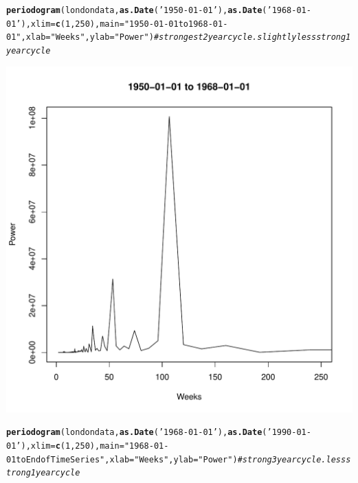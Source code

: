 \documentclass[12pt]{article}\usepackage[]{graphicx}\usepackage[]{color}
\makeatletter
\def\maxwidth{ %
  \ifdim\Gin@nat@width>\linewidth
    \linewidth
  \else
    \Gin@nat@width
  \fi
}
\newcommand{\hlnum}[1]{\textcolor[rgb]{0.686,0.059,0.569}{#1}}%
\newcommand{\hlstr}[1]{\textcolor[rgb]{0.192,0.494,0.8}{#1}}%
\newcommand{\hlcom}[1]{\textcolor[rgb]{0.678,0.584,0.686}{\textit{#1}}}%
\newcommand{\hlstd}[1]{\textcolor[rgb]{0.345,0.345,0.345}{#1}}%
\newcommand{\hlkwc}[1]{\textcolor[rgb]{0.333,0.667,0.333}{#1}}%
\newcommand{\hlkwd}[1]{\textcolor[rgb]{0.737,0.353,0.396}{\textbf{#1}}}%
\newenvironment{kframe}{%
 \def\at@end@of@kframe{}%
 \ifinner\ifhmode%
  \def\at@end@of@kframe{\end{minipage}}%
  \begin{minipage}{\columnwidth}%
 \fi\fi%
 \def\FrameCommand##1{\hskip\@totalleftmargin \hskip-\fboxsep
 \colorbox{shadecolor}{##1}\hskip-\fboxsep
     \hskip-\linewidth \hskip-\@totalleftmargin \hskip\columnwidth}%
 \MakeFramed {\advance\hsize-\width
   \@totalleftmargin\z@ \linewidth\hsize
   \@setminipage}}%
 {\par\unskip\endMakeFramed%
 \at@end@of@kframe}
\newenvironment{knitrout}{}{} %
\makeatother
\begin{document}
\begin{enumerate}[(a)]
\begin{knitrout}
\begin{kframe}\begin{alltt}
\hlkwd{periodogram}\hlstd{(londondata,}\hlkwd{as.Date}\hlstd{(}\hlstr{'1950-01-01'}\hlstd{),}\hlkwd{as.Date}\hlstd{(}\hlstr{'1968-01-01'}\hlstd{),}\hlkwc{xlim}\hlstd{=}\hlkwd{c}\hlstd{(}\hlnum{1}\hlstd{,}\hlnum{250}\hlstd{),} \hlkwc{main}\hlstd{=}\hlstr{"1950-01-01 to 1968-01-01"}\hlstd{,}\hlkwc{xlab}\hlstd{=}\hlstr{"Weeks"}\hlstd{,} \hlkwc{ylab}\hlstd{=}\hlstr{"Power"}\hlstd{)} \hlcom{#strongest 2 year cycle. slightly less strong 1 year cycle}
\end{alltt}
\end{kframe}
\includegraphics[width=\maxwidth]{figure/unnamed-chunk-5-5} 
\begin{kframe}\begin{alltt}
\hlkwd{periodogram}\hlstd{(londondata,}\hlkwd{as.Date}\hlstd{(}\hlstr{'1968-01-01'}\hlstd{),}\hlkwd{as.Date}\hlstd{(}\hlstr{'1990-01-01'}\hlstd{),}\hlkwc{xlim}\hlstd{=}\hlkwd{c}\hlstd{(}\hlnum{1}\hlstd{,}\hlnum{250}\hlstd{),} \hlkwc{main}\hlstd{=}\hlstr{"1968-01-01 to End of Time Series"}\hlstd{,}\hlkwc{xlab}\hlstd{=}\hlstr{"Weeks"}\hlstd{,} \hlkwc{ylab}\hlstd{=}\hlstr{"Power"}\hlstd{)}  \hlcom{#strong 3 year cycle. less strong 1 year cycle}
\end{alltt}
\end{kframe}

\end{knitrout}
\end{enumerate}
\end{document}
